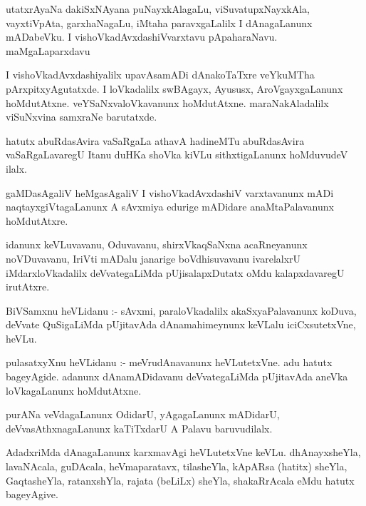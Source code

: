 \documentclass{article}
\begin{document}
\begin{mn}
utatxrAyaNa  dakiSxNAyana  puNayxkAlagaLu,  viSuvatupxNayxkAla,  vayxtiVpAta,  
garxhaNagaLu,  iMtaha  paravxgaLalilx  I  dAnagaLanunx  mADabeVku.  
I vishoVkadAvxdashiVvarxtavu  pApaharaNavu.  maMgaLaparxdavu
\end{mn}

\begin{mn}
I  vishoVkadAvxdashiyalilx  upavAsamADi  dAnakoTaTxre  veYkuMTha  pArxpitxyAgutatxde.  
I loVkadalilx  swBAgayx, Ayususx,  AroVgayxgaLanunx  hoMdutAtxne.  veYSaNxvaloVkavanunx  
hoMdutAtxne.  maraNakAladalilx  viSuNxvina  samxraNe  barutatxde.
\end{mn}

\begin{mn}
hatutx  abuRdasAvira  vaSaRgaLa  athavA  hadineMTu  abuRdasAvira  vaSaRgaLavaregU  
Itanu  duHKa  shoVka  kiVLu  sithxtigaLanunx  hoMduvudeV  ilalx.
\end{mn}

\begin{mn}
gaMDasAgaliV  heMgasAgaliV  I  vishoVkadAvxdashiV varxtavanunx  mADi  naqtayxgiVtagaLanunx  
A  sAvxmiya  edurige  mADidare  anaMtaPalavanunx  hoMdutAtxre.
\end{mn}

\begin{mn}
idanunx  keVLuvavanu,  Oduvavanu,  shirxVkaqSaNxna  acaRneyanunx  noVDuvavanu,  IriVti  
mADalu  janarige  boVdhisuvavanu  ivarelalxrU  iMdarxloVkadalilx  deVvategaLiMda  
pUjisalapxDutatx  oMdu  kalapxdavaregU  irutAtxre.
\end{mn}

\begin{mn}
BiVSamxnu  heVLidanu :- sAvxmi, paraloVkadalilx    akaSxyaPalavanunx  koDuva,  deVvate  
QuSigaLiMda  pUjitavAda  dAnamahimeynunx  keVLalu  iciCxsutetxVne,  heVLu.
\end{mn}

\begin{mn}
pulasatxyXnu  heVLidanu :- meVrudAnavanunx  heVLutetxVne.  adu  hatutx  bageyAgide.  
adanunx  dAnamADidavanu  deVvategaLiMda  pUjitavAda  aneVka  loVkagaLanunx  hoMdutAtxne.
\end{mn}

\begin{mn}
purANa  veVdagaLanunx  OdidarU,  yAgagaLanunx  mADidarU,  deVvasAthxnagaLanunx  
kaTiTxdarU  A  Palavu  baruvudilalx.
\end{mn}

\begin{mn}
AdadxriMda  dAnagaLanunx  karxmavAgi  heVLutetxVne  keVLu.  dhAnayxsheYla,  lavaNAcala,  
guDAcala,  heVmaparatavx,  tilasheYla,  kApARsa (hatitx)  sheYla, GaqtasheYla,  ratanxshYla,  
rajata (beLiLx) sheYla,  shakaRrAcala  eMdu  hatutx  bageyAgive.  
\end{mn}
\end{document}
